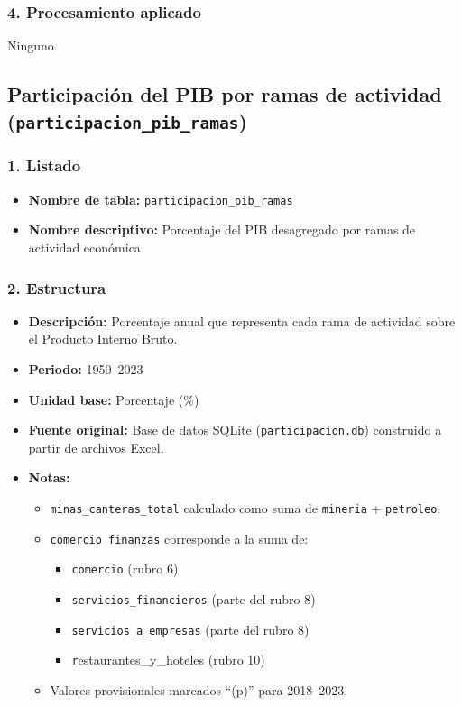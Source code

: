 \documentclass[12pt,a4paper]{article}
\begin{document}
\subsubsection*{4. Procesamiento aplicado}
Ninguno.

\subsection{Participación del PIB por ramas de actividad\\
\small(\texttt{participacion\_pib\_ramas})}

\subsubsection*{1. Listado}
\begin{itemize}
  \item \textbf{Nombre de tabla:} \texttt{participacion\_pib\_ramas}
  \item \textbf{Nombre descriptivo:} Porcentaje del PIB desagregado por ramas de actividad económica
\end{itemize}

\subsubsection*{2. Estructura}
\begin{itemize}
  \item \textbf{Descripción:} Porcentaje anual que representa cada rama de actividad sobre el Producto Interno Bruto.
  \item \textbf{Periodo:} 1950--2023
  \item \textbf{Unidad base:} Porcentaje (\%)
  \item \textbf{Fuente original:} Base de datos SQLite (\texttt{participacion.db}) construido a partir de archivos Excel.
  \item \textbf{Notas:}
    \begin{itemize}
      \item \texttt{minas\_canteras\_total} calculado como suma de \texttt{mineria} + \texttt{petroleo}.
      \item \texttt{comercio\_finanzas} corresponde a la suma de:
        \begin{itemize}
          \item \texttt{comercio} (rubro 6)
          \item \texttt{servicios\_financieros} (parte del rubro 8)
          \item \texttt{servicios\_a\_empresas} (parte del rubro 8)
          \item 
          \texttt restaurantes\_y\_hoteles (rubro 10)
        \end{itemize}
      \item Valores provisionales marcados “(p)” para 2018–2023.
    \end{itemize}
\end{itemize}
\end{document}
